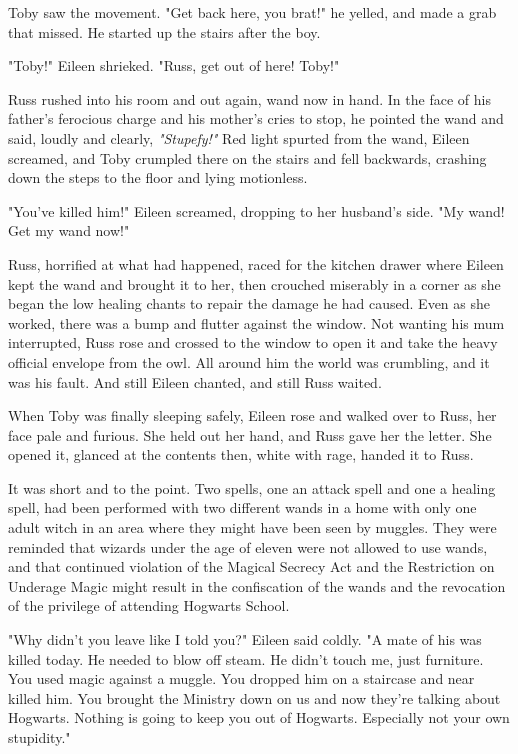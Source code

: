 Toby saw the movement. "Get back here, you brat!" he yelled, and made a grab that missed. He started up the stairs after the boy.

"Toby!" Eileen shrieked. "Russ, get out of here! Toby!"

Russ rushed into his room and out again, wand now in hand. In the face of his father's ferocious charge and his mother's cries to stop, he pointed the wand and said, loudly and clearly, \emph{"Stupefy!"} Red light spurted from the wand, Eileen screamed, and Toby crumpled there on the stairs and fell backwards, crashing down the steps to the floor and lying motionless.

"You've killed him!" Eileen screamed, dropping to her husband's side. "My wand! Get my wand now!"

Russ, horrified at what had happened, raced for the kitchen drawer where Eileen kept the wand and brought it to her, then crouched miserably in a corner as she began the low healing chants to repair the damage he had caused. Even as she worked, there was a bump and flutter against the window. Not wanting his mum interrupted, Russ rose and crossed to the window to open it and take the heavy official envelope from the owl. All around him the world was crumbling, and it was his fault. And still Eileen chanted, and still Russ waited.

When Toby was finally sleeping safely, Eileen rose and walked over to Russ, her face pale and furious. She held out her hand, and Russ gave her the letter. She opened it, glanced at the contents then, white with rage, handed it to Russ.

It was short and to the point. Two spells, one an attack spell and one a healing spell, had been performed with two different wands in a home with only one adult witch in an area where they might have been seen by muggles. They were reminded that wizards under the age of eleven were not allowed to use wands, and that continued violation of the Magical Secrecy Act and the Restriction on Underage Magic might result in the confiscation of the wands and the revocation of the privilege of attending Hogwarts School.

"Why didn't you leave like I told you?" Eileen said coldly. "A mate of his was killed today. He needed to blow off steam. He didn't touch me, just furniture. You used magic against a muggle. You dropped him on a staircase and near killed him. You brought the Ministry down on us and now they're talking about Hogwarts. Nothing is going to keep you out of Hogwarts. Especially not your own stupidity."


